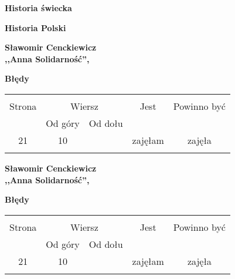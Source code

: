 \documentclass[a4paper,11pt]{article}
\newcommand{\spaceOne}{2em}
\newcommand{\spaceThree}{0.5em}
\newcommand{\tb}{\textbf}
\newcommand{\Center}[1]{\begin{center} #1 \end{center}}
\newcommand{\CenterTB}[1]{\Center{\tb{#1}}}
\newcommand{\Field}[1]{ \begin{center} {\Large \tb{#1} } \end{center} }
\newcommand{\Work}[1]{ \begin{center} {\large \tb{#1}} \end{center} }
\begin{document}
\vspace{\spaceOne}





\newpage
\Field{Historia świecka}

\vspace{\spaceOne}






\Field{Historia Polski}

\vspace{\spaceThree}




\Work{
  Sławomir Cenckiewicz \\
  ,,Anna Solidarność'', \cite{Cen10} }


\CenterTB{Błędy}
\begin{center}
  \begin{tabular}{|c|c|c|c|c|}
    \hline
    & \multicolumn{2}{c|}{} & & \\
    Strona & \multicolumn{2}{c|}{Wiersz}& Jest & Powinno być \\ \cline{2-3}
    & Od góry & Od dołu &  &  \\ \hline
    21 & 10 & & zajęłam & zajęła \\
    & & & & \\ \hline
  \end{tabular}
\end{center}



\Work{
  Sławomir Cenckiewicz \\
  ,,Anna Solidarność'', \cite{Cen10} }


\CenterTB{Błędy}
\begin{center}
  \begin{tabular}{|c|c|c|c|c|}
    \hline
    & \multicolumn{2}{c|}{} & & \\
    Strona & \multicolumn{2}{c|}{Wiersz}& Jest & Powinno być \\ \cline{2-3}
    & Od góry & Od dołu &  &  \\ \hline
    21 & 10 & & zajęłam & zajęła \\
    & & & & \\ \hline
  \end{tabular}
\end{center}
\end{document}
